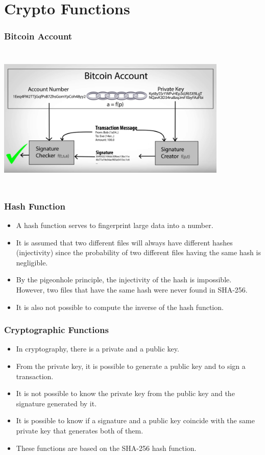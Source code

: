 \documentclass{beamer}
\begin{document}
\section{Crypto Functions}

\begin{frame}
  \frametitle{Bitcoin Account}
    \includegraphics[width=11cm, height=7cm]{privatekey}
\end{frame}

\begin{frame}
  \frametitle{Hash Function}
  \begin{itemize}[<+->]
    \item A hash function serves to fingerprint large data into a number.
    \item It is assumed that two different files will always have different hashes (injectivity)
   since the probability of two different files having the same hash is negligible.
    \item By the pigeonhole principle, the injectivity of the hash is impossible.
      However, two files that have the same hash were never found in SHA-256.
    \item It is also not possible to compute the inverse of the hash function.
  \end{itemize}
\end{frame}

\begin{frame}
  \frametitle{Cryptographic Functions}
  \begin{itemize}[<+->]
    \item In cryptography, there is a private and a public key.
    \item From the private key, it is possible to generate a public key
 and to sign a transaction.
    \item It is not possible to know the private key from the public key and the signature generated by it.
    \item It is possible to know if a signature and a public key coincide with the same private key that generates both of them.
    \item These functions are based on the SHA-256 hash function.
  \end{itemize}
\end{frame}
\end{document}
